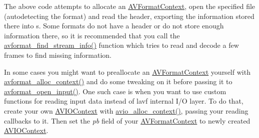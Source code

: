  The above code attempts to allocate an \hyperlink{struct_a_v_format_context}{A\+V\+Format\+Context}, open the specified file (autodetecting the format) and read the header, exporting the information stored there into s. Some formats do not have a header or do not store enough information there, so it is recommended that you call the \hyperlink{group__lavf__decoding_gad42172e27cddafb81096939783b157bb}{avformat\+\_\+find\+\_\+stream\+\_\+info()} function which tries to read and decode a few frames to find missing information.

In some cases you might want to preallocate an \hyperlink{struct_a_v_format_context}{A\+V\+Format\+Context} yourself with \hyperlink{group__lavf__core_gac7a91abf2f59648d995894711f070f62}{avformat\+\_\+alloc\+\_\+context()} and do some tweaking on it before passing it to \hyperlink{group__lavf__decoding_ga10a404346c646e4ab58f4ed798baca32}{avformat\+\_\+open\+\_\+input()}. One such case is when you want to use custom functions for reading input data instead of lavf internal I/O layer. To do that, create your own \hyperlink{struct_a_v_i_o_context}{A\+V\+I\+O\+Context} with \hyperlink{avio_8h_a853f5149136a27ffba3207d8520172a5}{avio\+\_\+alloc\+\_\+context()}, passing your reading callbacks to it. Then set the {\itshape pb} field of your \hyperlink{struct_a_v_format_context}{A\+V\+Format\+Context} to newly created \hyperlink{struct_a_v_i_o_context}{A\+V\+I\+O\+Context}.

